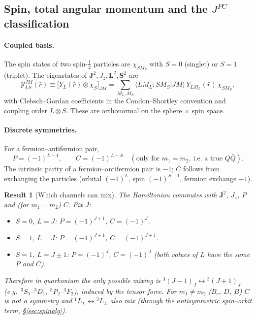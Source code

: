 \documentclass[11pt,a4paper]{article}
\numberwithin{equation}{section}
\theoremstyle{definition}
\theoremstyle{plain}
\newtheorem{result}[definition]{Result}
\theoremstyle{remark}
\numberwithin{algorithm}{section}
\newcommand{\vL}{\bm L}
\newcommand{\vS}{\bm S}
\newcommand{\vJ}{\bm J}
\newcommand{\SY}{\mathcal Y}
\begin{document}
\subsection{\texorpdfstring{Spin, total angular momentum and the $J^{PC}$ classification}{Spin, total angular momentum and the JPC classification}}\label{sec:jpc}
\paragraph{Coupled basis.} The spin states of two spin-$\tfrac12$ particles are $\chi_{SM_S}$ with $S=0$ (singlet) or $S=1$ (triplet).
The eigenstates of $\vJ^2,J_z,\vL^2,\vS^2$ are
\begin{equation}
\SY^{JM}_{LS}(\hat r)\equiv\big[Y_L(\hat r)\otimes\chi_S\big]_{JM}=\sum_{M_L,M_S}\langle L M_L;S M_S|JM\rangle\,Y_{LM_L}(\hat r)\,\chi_{SM_S},
\label{eq:spinangle}
\end{equation}
with Clebsch--Gordan coefficients in the Condon--Shortley convention and coupling order $L\otimes S$. These are orthonormal on the sphere $\times$ spin space.

\paragraph{Discrete symmetries.} For a fermion--antifermion pair,
\begin{equation}
P=(-1)^{L+1},\qquad C=(-1)^{L+S}\quad(\text{only for }m_1=m_2,\ \text{i.e.\ a true }Q\bar Q).
\end{equation}
The intrinsic parity of a fermion--antifermion pair is $-1$; $C$ follows from exchanging the particles (orbital $(-1)^L$, spin $(-1)^{S+1}$, fermion exchange $-1$).

\begin{result}[Which channels can mix]
The Hamiltonian commutes with $\vJ^2$, $J_z$, $P$ and (for $m_1=m_2$) $C$. Fix $J$:
\begin{itemize}[leftmargin=1.2em,itemsep=1pt]
\item $S=0$, $L=J$: $P=(-1)^{J+1}$, $C=(-1)^J$.
\item $S=1$, $L=J$: $P=(-1)^{J+1}$, $C=(-1)^{J+1}$.
\item $S=1$, $L=J\pm1$: $P=(-1)^J$, $C=(-1)^J$ (both values of $L$ have the same $P$ and $C$).
\end{itemize}
Therefore in quarkonium the only possible mixing is ${}^3(J{-}1)_J\leftrightarrow{}^3(J{+}1)_J$ (e.g.\ ${}^3S_1$--${}^3D_1$, ${}^3P_2$--${}^3F_2$), induced by the tensor force.
For $m_1\neq m_2$ ($B_c$, $D$, $B$) $C$ is not a symmetry and ${}^1L_L\leftrightarrow{}^3L_L$ also mix (through the antisymmetric spin--orbit term, \S\ref{sec:spinalg}).
\end{result}
\end{document}
